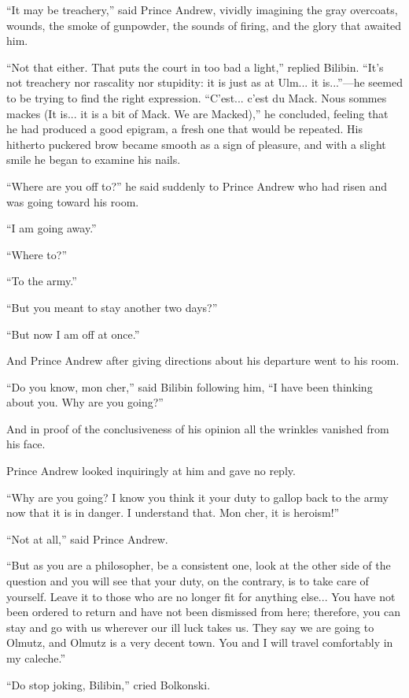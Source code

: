 ``It may be treachery,'' said Prince Andrew, vividly imagining
the gray overcoats, wounds, the smoke of gunpowder, the sounds of
firing, and the glory that awaited him.

``Not that either. That puts the court in too bad a light,''
replied Bilibin. ``It's not treachery nor rascality nor
stupidity: it is just as at Ulm... it is...''---he seemed to be
trying to find the right expression. ``C'est... c'est du
Mack. Nous sommes mackes (It is... it is a bit of Mack. We are
Macked),'' he concluded, feeling that he had produced a good
epigram, a fresh one that would be repeated. His hitherto
puckered brow became smooth as a sign of pleasure, and with a
slight smile he began to examine his nails.

``Where are you off to?'' he said suddenly to Prince Andrew who
had risen and was going toward his room.

``I am going away.''

``Where to?''

``To the army.''

``But you meant to stay another two days?''

``But now I am off at once.''

And Prince Andrew after giving directions about his departure
went to his room.

``Do you know, mon cher,'' said Bilibin following him, ``I have
been thinking about you. Why are you going?''

And in proof of the conclusiveness of his opinion all the
wrinkles vanished from his face.

Prince Andrew looked inquiringly at him and gave no reply.

``Why are you going? I know you think it your duty to gallop back
to the army now that it is in danger. I understand that. Mon
cher, it is heroism!''

``Not at all,'' said Prince Andrew.

``But as you are a philosopher, be a consistent one, look at the
other side of the question and you will see that your duty, on
the contrary, is to take care of yourself. Leave it to those who
are no longer fit for anything else... You have not been ordered
to return and have not been dismissed from here; therefore, you
can stay and go with us wherever our ill luck takes us. They say
we are going to Olmutz, and Olmutz is a very decent town. You and
I will travel comfortably in my caleche.''

``Do stop joking, Bilibin,'' cried Bolkonski.

